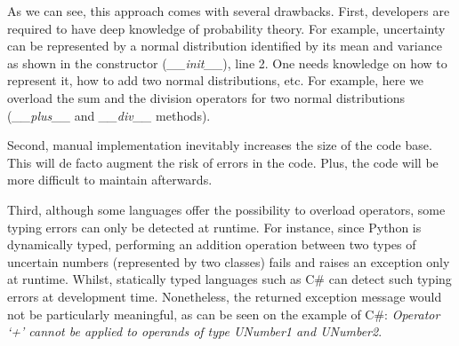 As we can see, this approach comes with several drawbacks.
First, developers are required to have deep knowledge of probability theory.
For example, uncertainty can be represented by a normal distribution identified by its mean and variance as shown in the constructor (\textit{\_\_init\_\_}), line 2.
One needs knowledge on how to represent it, how to add two normal distributions, etc.
For example, here we overload the sum and the division operators for two normal distributions (\textit{\_\_plus\_\_} and \textit{\_\_div\_\_} methods).

Second, manual implementation inevitably increases the size of the code base.
This will de facto augment the risk of errors in the code.
Plus, the code will be more difficult to maintain afterwards.

Third, although some languages offer the possibility to overload operators, some typing errors can only be detected at runtime. 
For instance, since Python is dynamically typed, performing an addition operation between two types of uncertain numbers (\ie represented by two classes) fails and raises an exception only at runtime.
Whilst, statically typed languages such as C\# can detect such typing errors at development time. 
Nonetheless, the returned exception message would not be particularly meaningful, as can be seen on the example of  C\#: \textit{Operator `+' cannot be applied to operands of type UNumber1 and UNumber2}.

%
%
%
%
%

